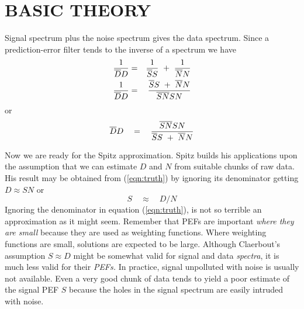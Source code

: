 \section{BASIC THEORY}
Signal spectrum
plus the noise spectrum gives the data spectrum.
Since a prediction-error filter tends to the inverse of a spectrum
we have
\begin{eqnarray}
        {1\over \overline{D}D}
        &=&
        {1\over \overline{S}S}
        \ + \ 
        {1\over \overline{N}N}
\label{eqn:powersadd}
\\
        {1\over \overline{D}D}
        &=&
        { \overline{S}S} \ + \ { \overline{N}N}
         \over
         { \overline{SN} SN}
\end{eqnarray}
or
\begin{equation}
\overline{D}D
\quad =\quad
{
        { \overline{SN} SN}
 \over
        { \overline{S}S} \ + \ { \overline{N}N}
}
\label{eqn:truth}
\end{equation}

Now we are ready for the Spitz approximation.
Spitz builds his applications upon
the assumption that we can estimate $D$
and $N$ from suitable chunks of raw data.
His result may be obtained  from
(\ref{eqn:truth}) by ignoring its denominator getting
$D\approx SN$ or
\begin{equation}
S \quad\approx\quad D/N
\end{equation}
Ignoring
the denominator
in equation (\ref{eqn:truth}),
is not so terrible an approximation
as it might seem.
Remember that PEFs are important {\it where they are small}
because they are used as weighting functions.
Where weighting functions are small,
solutions are expected to be large.
Although Claerbout's assumption
$ S \approx D$ might be somewhat valid for signal and data
{\it spectra},
it is much less valid for their
{\it PEFs.}
In practice,
signal unpolluted with noise is usually not available.
Even a very good chunk of data
tends to yield a poor estimate of the signal PEF $S$
because the holes in the signal spectrum are
easily intruded with noise.

